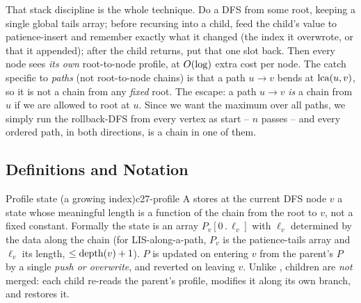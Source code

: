 That stack discipline is the whole technique. Do a DFS from some root, keeping a
single global tails array; before recursing into a child, feed the child's value
to patience-insert and remember exactly what it changed (the index it overwrote,
or that it appended); after the child returns, put that one slot back. Then every
node sees \emph{its own} root-to-node profile, at $O(\log)$ extra cost per node.
The catch specific to \emph{paths} (not root-to-node chains) is that a path $u\!\to\!v$
bends at $\operatorname{lca}(u,v)$, so it is not a chain from any \emph{fixed} root. The escape:
a path $u\!\to\!v$ \emph{is} a chain from $u$ if we are allowed to root at $u$. Since
we want the maximum over all paths, we simply run the rollback-DFS from every
vertex as start -- $n$ passes -- and every ordered path, in both directions, is a
chain in one of them.

\subsection{Definitions and Notation}

\begin{definition}{Profile state (a growing index)}{c27-profile}
A  stores at the current DFS node $v$ a state whose meaningful
length is a function of the chain from the root to $v$, not a fixed constant.
Formally the state is an array $P_v[0\,.\,\ell_v]$ with $\ell_v$ determined by the
data along the chain (for LIS-along-a-path, $P_v$ is the patience-tails array and
$\ell_v$ its length, $\le \operatorname{depth}(v)+1$). $P$ is updated on entering $v$ from the
parent's $P$ by a single \emph{push or overwrite}, and reverted on leaving $v$.
Unlike , children are \emph{not} merged: each child re-reads
the parent's profile, modifies it along its own branch, and restores it.
\end{definition}

